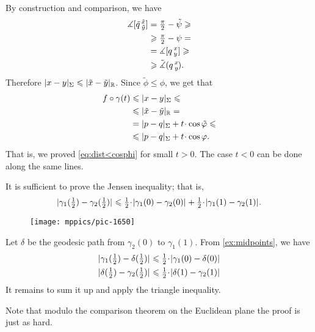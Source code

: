 By construction and comparison, we have 
\begin{align*}
\measuredangle[\tilde q\,{}^{\tilde x}_{\tilde y}]&=\tfrac\pi2-\tilde\psi
\geqslant
\\
&\geqslant
\tfrac\pi2-\psi
=
\\
&=
\measuredangle[q\,{}^{x}_{y}]
\geqslant 
\\
&\geqslant \tilde\measuredangle(q\,{}^{x}_{y}\hspace{-0.2ex}).
\end{align*}
Therefore $|x-y|_\Sigma\leqslant |\tilde x-\tilde y|_{\mathbb{R}}$.
Since $\tilde\phi\le\phi$, we get that
\begin{align*}
f\circ\gamma(t)&\le |x-y|_\Sigma\le 
\\
&\le|\tilde x-\tilde y|_{\RR}=
\\
&=|p-q|_\Sigma+t\cdot\cos\tilde\phi
\le
\\
&\le|p-q|_\Sigma+t\cdot\cos\phi.
\end{align*}
That is, we proved \ref{eq:dist<cosphi} for small $t>0$.
The case $t<0$ can be done along the same lines. 

It is sufficient to prove the Jensen inequality;
that is, 
\[
\dist{\gamma_1(\tfrac12)}{\gamma_2(\tfrac12)}{}
\le
\tfrac12\cdot\dist{\gamma_1(0)}{\gamma_2(0)}{}
+
\tfrac12\cdot \dist{\gamma_1(1)}{\gamma_2(1)}{}.
\]

{

\begin{wrapfigure}{o}{45 mm}
\vskip-0mm
\centering
\texttt{[image: mppics/pic-1650]}
\end{wrapfigure}

Let $\delta$ be the geodesic path from $\gamma_2(0)$ to $\gamma_1(1)$.
From \ref{ex:midpoints}, we have
\begin{align*}
\dist{\gamma_1(\tfrac12)}{\delta(\tfrac12)}{}
&\le
\tfrac12\cdot\dist{\gamma_1(0)}{\delta(0)}{}
\\
\dist{\delta(\tfrac12)}{\gamma_2(\tfrac12)}{}
&\le
\tfrac12\cdot\dist{\delta(1)}{\gamma_2(1)}{}
\end{align*}
It remains to sum it up and apply the triangle inequality.

 Note that modulo the comparison theorem 
on the Euclidean plane the proof is just as hard.

}




